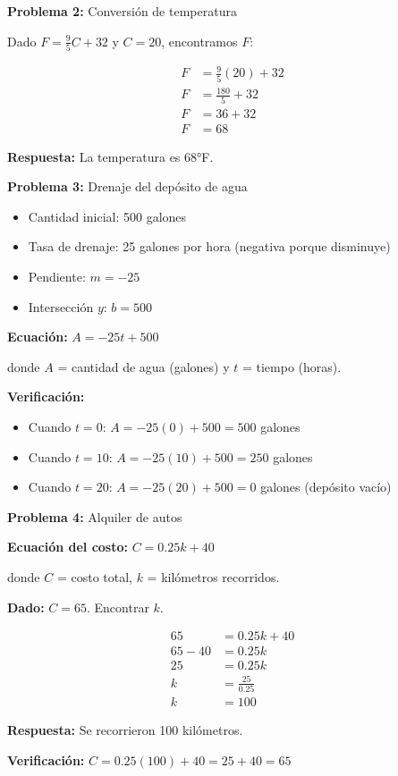\medskip

\textbf{Problema 2:} Conversión de temperatura

Dado $F = \frac{9}{5}C + 32$ y $C = 20$, encontramos $F$:

\begin{align*}
F &= \frac{9}{5}(20) + 32 \\
F &= \frac{180}{5} + 32 \\
F &= 36 + 32 \\
F &= 68
\end{align*}

\textbf{Respuesta:} La temperatura es 68°F.

\medskip

\textbf{Problema 3:} Drenaje del depósito de agua

\begin{itemize}
    \item Cantidad inicial: 500 galones
    \item Tasa de drenaje: 25 galones por hora (negativa porque disminuye)
    \item Pendiente: $m = -25$
    \item Intersección $y$: $b = 500$
\end{itemize}

\textbf{Ecuación:} $A = -25t + 500$

donde $A$ = cantidad de agua (galones) y $t$ = tiempo (horas).

\textbf{Verificación:}
\begin{itemize}
    \item Cuando $t = 0$: $A = -25(0) + 500 = 500$ galones \checkmark
    \item Cuando $t = 10$: $A = -25(10) + 500 = 250$ galones
    \item Cuando $t = 20$: $A = -25(20) + 500 = 0$ galones (depósito vacío)
\end{itemize}

\medskip

\textbf{Problema 4:} Alquiler de autos

\textbf{Ecuación del costo:} $C = 0.25k + 40$

donde $C$ = costo total, $k$ = kilómetros recorridos.

\textbf{Dado:} $C = 65$. Encontrar $k$.

\begin{align*}
65 &= 0.25k + 40 \\
65 - 40 &= 0.25k \\
25 &= 0.25k \\
k &= \frac{25}{0.25} \\
k &= 100
\end{align*}

\textbf{Respuesta:} Se recorrieron 100 kilómetros.

\textbf{Verificación:} $C = 0.25(100) + 40 = 25 + 40 = 65$ \checkmark
